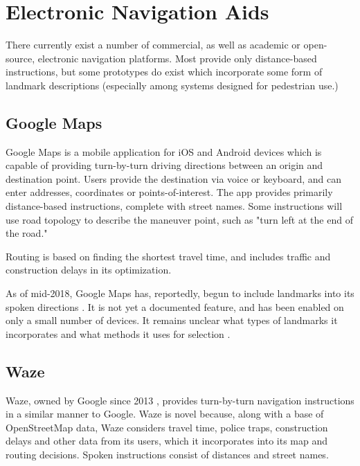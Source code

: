 \section{Electronic Navigation Aids}\label{Sect:eqns}

There currently exist a number of commercial, as well as academic or open-source, electronic navigation platforms. Most provide only distance-based instructions, but some prototypes do exist which incorporate some form of landmark descriptions (especially among systems designed for pedestrian use.)

\subsection{Google Maps}
Google Maps is a mobile application for iOS and Android devices which is capable of providing turn-by-turn driving directions between an origin and destination point. Users provide the destination via voice or keyboard, and can enter addresses, coordinates or points-of-interest. The app provides primarily distance-based instructions, complete with street names. Some instructions will use road topology to describe the maneuver point, such as "turn left at the end of the road."

Routing is based on finding the shortest travel time, and includes traffic and construction delays in its optimization.

As of mid-2018, Google Maps has, reportedly, begun to include landmarks into its spoken directions \cite{fingas_2018}. It is not yet a documented feature, and has been enabled on only a small number of devices. It remains unclear what types of landmarks it incorporates and what methods it uses for selection \cite{fingas_2018}.

\subsection{Waze}
Waze, owned by Google since 2013 \cite{schneider_2014}, provides turn-by-turn navigation instructions in a similar manner to Google. Waze is novel because, along with a base of OpenStreetMap data, Waze considers travel time, police traps, construction delays and other data from its users, which it incorporates into its map and routing decisions. Spoken instructions consist of distances and street names.
